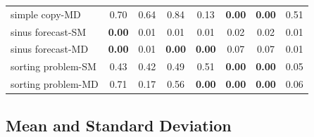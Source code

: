 \documentclass{article}
\begin{document}
\begin{table}[H]
{\begin{tabular}{lccccccc}
    simple copy-MD                    & 0.70      & 0.64      & 0.84      & 0.13      & \textbf{0.00}               & \textbf{0.00}              & 0.51      \\
    sinus forecast-SM              & \textbf{0.00}  & 0.01      & 0.01      & 0.01      & 0.02                   & 0.02                  & 0.01      \\
    sinus forecast-MD              & \textbf{0.00}  & 0.01      & \textbf{0.00}  & \textbf{0.00}  & 0.07                   & 0.07                  & 0.01      \\
    sorting problem-SM                & 0.43      & 0.42      & 0.49      & 0.51      & \textbf{0.00}               & \textbf{0.00}              & 0.05      \\
    sorting problem-MD                & 0.71      & 0.17      & 0.56      & \textbf{0.00}  & \textbf{0.00}               & \textbf{0.00}              & 0.06      \\
    \bottomrule
    \end{tabular}
}
\end{table}

\newpage
\subsection{Mean and Standard Deviation}
\label{app:results_mean}
\end{document}
